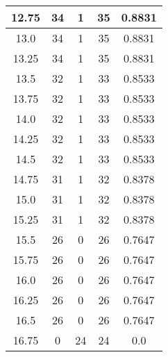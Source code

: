 \documentclass[letterpaper, 12pt]{article}
\begin{document}
\begin{longtable}{|c|c|c|c|c|}
\hline
12.75 & 34 & 1 & 35 & 0.8831 \\
\hline
13.0 & 34 & 1 & 35 & 0.8831 \\
\hline
13.25 & 34 & 1 & 35 & 0.8831 \\
\hline
13.5 & 32 & 1 & 33 & 0.8533 \\
\hline
13.75 & 32 & 1 & 33 & 0.8533 \\
\hline
14.0 & 32 & 1 & 33 & 0.8533 \\
\hline
14.25 & 32 & 1 & 33 & 0.8533 \\
\hline
14.5 & 32 & 1 & 33 & 0.8533 \\
\hline
14.75 & 31 & 1 & 32 & 0.8378 \\
\hline
15.0 & 31 & 1 & 32 & 0.8378 \\
\hline
15.25 & 31 & 1 & 32 & 0.8378 \\
\hline
15.5 & 26 & 0 & 26 & 0.7647 \\
\hline
15.75 & 26 & 0 & 26 & 0.7647 \\
\hline
16.0 & 26 & 0 & 26 & 0.7647 \\
\hline
16.25 & 26 & 0 & 26 & 0.7647 \\
\hline
16.5 & 26 & 0 & 26 & 0.7647 \\
\hline
16.75 & 0 & 24 & 24 & 0.0 \\
\hline
\end{longtable}
\end{document}
